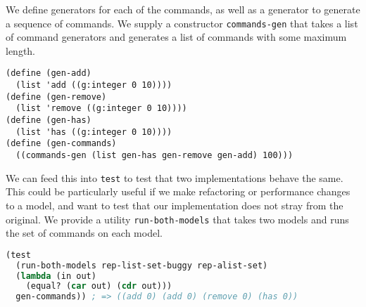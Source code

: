 We define generators for each of the commands, as well as a generator to generate a sequence of commands. We supply a constructor \verb|commands-gen| that takes a list of command generators and generates a list of commands with some maximum length.
\begin{lstlisting}
(define (gen-add)
  (list 'add ((g:integer 0 10))))
(define (gen-remove)
  (list 'remove ((g:integer 0 10))))
(define (gen-has)
  (list 'has ((g:integer 0 10))))
(define (gen-commands)
  ((commands-gen (list gen-has gen-remove gen-add) 100)))
\end{lstlisting}

We can feed this into \verb|test| to test that two implementations behave the same. This could be particularly useful if we make refactoring or performance changes to a model, and want to test that our implementation does not stray from the original. We provide a utility \verb|run-both-models| that takes two models and runs the set of commands on each model.

\begin{lstlisting}[language=lisp]
(test 
  (run-both-models rep-list-set-buggy rep-alist-set)
  (lambda (in out)
    (equal? (car out) (cdr out)))
  gen-commands)) ; => ((add 0) (add 0) (remove 0) (has 0))
\end{lstlisting}
